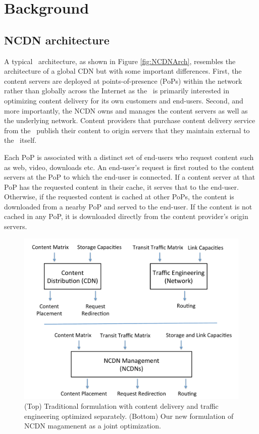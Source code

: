 
\section{Background}
\label{sec:ncdn-background}

\subsection{NCDN architecture} 

A typical \ncp\ architecture, as shown in Figure \ref{fig:NCDNArch}, resembles the architecture of a global CDN but with some important differences. First,  the content servers are deployed at points-of-presence (PoPs) within the network rather than globally across the Internet as the \ncp\ is primarily interested in optimizing content delivery for its own customers and end-users. Second, and more importantly, the NCDN owns and manages the content servers as well as the underlying network. Content providers that purchase content delivery service from the \ncp\ publish their content to origin servers that they maintain external to the \ncp\ itself. 

Each PoP is associated with a distinct set of end-users who request content such as web, video, downloads etc.  An end-user's request is first routed to the content servers at the PoP to which the end-user is connected.  If a content server at that PoP has the requested content in their cache, it serves that to the end-user. Otherwise, if the requested content is cached at other PoPs, the content is downloaded from a nearby PoP and served to the end-user. If the content is not cached in any PoP, it is downloaded directly from  the content provider's origin servers.

\begin{figure}[t]
\centerline{\includegraphics[scale=0.31]{ncdnpaper/NCDN}}
\caption{(Top) Traditional formulation with content delivery and traffic engineering optimized separately. (Bottom) Our new formulation of NCDN magamenent as a joint optimization.}
\vspace{-0.2in}
\label{fig:ncdntraditional}
\end{figure}


